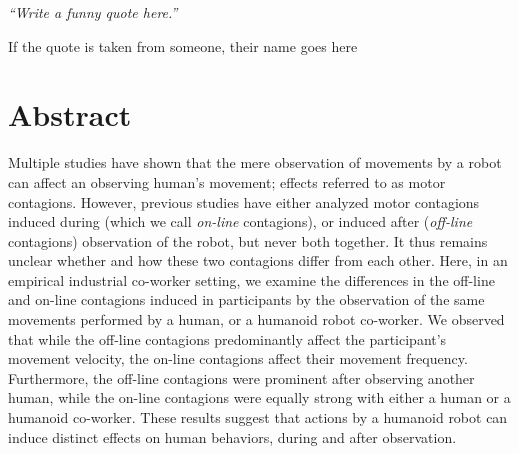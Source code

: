 \documentclass[a4paper, 11pt, oneside]{Thesis}  %
\begin{document}
\null\vfill
\textit{``Write a funny quote here.''}

\begin{flushright}
If the quote is taken from someone, their name goes here
\end{flushright}

\vfill\vfill\vfill\vfill\vfill\vfill\null
\clearpage  %

\section*{\huge Abstract}
Multiple studies have shown that the mere observation of movements by a robot can affect an observing human's movement; effects referred to as motor contagions. However, previous studies have either analyzed motor contagions induced during (which we call \emph{on-line} contagions), or induced after (\emph{off-line} contagions) observation of the robot, but never both together. It thus remains unclear whether and how these two contagions differ from each other. Here, in an empirical industrial co-worker setting, we examine the differences in the off-line and on-line contagions induced in participants by the observation of the same movements performed by a human, or a humanoid robot co-worker. We observed that while the off-line contagions predominantly affect the participant's movement velocity, the on-line contagions affect their movement frequency. Furthermore, the off-line contagions were prominent after observing another human, while the on-line contagions were equally strong with either a human or a humanoid co-worker. These results suggest that actions by a humanoid robot can induce distinct effects on human behaviors, during and after observation.  	
\end{document}
